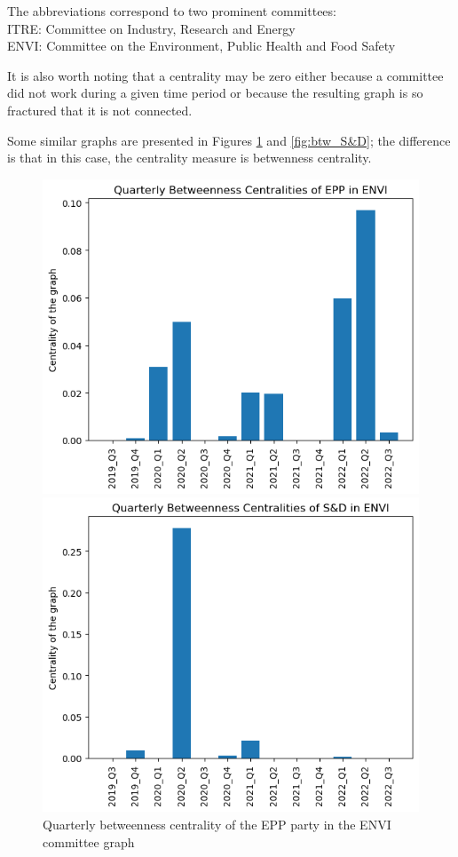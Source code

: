 \documentclass[lettersize,journal]{IEEEtran}
\begin{document}
The abbreviations correspond to two prominent committees:\\
ITRE: Committee on Industry, Research and Energy\\
ENVI: Committee on the Environment, Public Health and Food Safety

It is also worth noting that a centrality may be zero either because a committee did not work during a given time period or because the resulting graph is so fractured that it is not connected. %

Some similar graphs are presented in Figures \ref{fig:btw_EPP} and \ref{fig:btw_S&D}; the difference is that in this case, the centrality measure is betwenness centrality.

\begin{figure}[h]
  \centering
  \begin{minipage}[b]{0.23\textwidth}
    \includegraphics[width=\textwidth]{EPP_ENVI_Q_betweenness.png}
    \caption{Quarterly betweenness centrality of the EPP party in the ENVI committee graph}
    \label{fig:btw_EPP}
  \end{minipage}
  \hfill
  \begin{minipage}[b]{0.23\textwidth}
    \includegraphics[width=\textwidth]{S&D_ENVI_Q_betweenness.png}

\end{minipage}
\end{figure}
\end{document}
